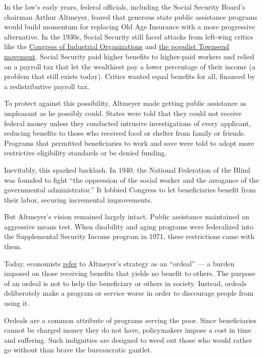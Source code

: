 In the law's early years, federal officials, including the Social
Security Board's chairman Arthur Altmeyer, feared that generous state
public assistance programs would build momentum for replacing Old Age
Insurance with a more progressive alternative. In the 1930s, Social
Security still faced attacks from left-wing critics like the
\href{https://www.finance.senate.gov/imo/media/doc/77HrgPensions.pdf}{Congress
of Industrial Organizations} and
\href{https://www.ssa.gov/history/towns5.html}{the populist Townsend
movement}. Social Security paid higher benefits to higher-paid workers
and relied on a payroll tax that let the wealthiest pay a lower
percentage of their income (a problem that still exists today). Critics
wanted equal benefits for all, financed by a redistributive payroll tax.

To protect against this possibility, Altmeyer made getting public
assistance as unpleasant as he possibly could. States were told that
they could not receive federal money unless they conducted intrusive
investigations of every applicant, reducing benefits to those who
received food or shelter from family or friends. Programs that permitted
beneficiaries to work and save were told to adopt more restrictive
eligibility standards or be denied funding.

Inevitably, this sparked backlash. In 1940, the National Federation of
the Blind was founded to fight ``the oppression of the social worker and
the arrogance of the governmental administrator.'' It lobbied Congress
to let beneficiaries benefit from their labor, securing incremental
improvements.

But Altmeyer's vision remained largely intact. Public assistance
maintained an aggressive means test. When disability and aging programs
were federalized into the Supplemental Security Income program in 1971,
these restrictions came with them.

Today, economists \href{https://www.nber.org/papers/w26041}{refer} to
Altmeyer's strategy as an ``ordeal'' --- a burden imposed on those
receiving benefits that yields no benefit to others. The purpose of an
ordeal is not to help the beneficiary or others in society. Instead,
ordeals deliberately make a program or service worse in order to
discourage people from using it.

Ordeals are a common attribute of programs serving the poor. Since
beneficiaries cannot be charged money they do not have, policymakers
impose a cost in time and suffering. Such indignities are designed to
weed out those who would rather go without than brave the bureaucratic
gantlet.

